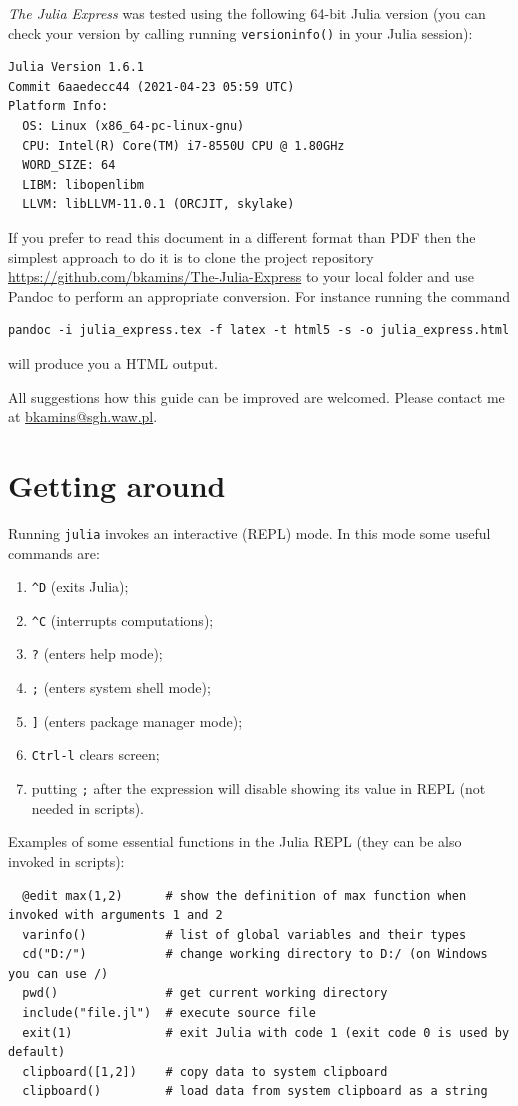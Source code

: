 \documentclass[10pt,a4paper]{article}
\begin{document}
\emph{The Julia Express} was tested using the following 64-bit Julia version
(you can check your version by calling running \lstinline|versioninfo()| in your
Julia session):
\begin{lstlisting}
Julia Version 1.6.1
Commit 6aaedecc44 (2021-04-23 05:59 UTC)
Platform Info:
  OS: Linux (x86_64-pc-linux-gnu)
  CPU: Intel(R) Core(TM) i7-8550U CPU @ 1.80GHz
  WORD_SIZE: 64
  LIBM: libopenlibm
  LLVM: libLLVM-11.0.1 (ORCJIT, skylake)
\end{lstlisting}



If you prefer to read this document in a different format than PDF then the
simplest approach to do it is to clone the project repository
\url{https://github.com/bkamins/The-Julia-Express} to your local folder and use
Pandoc to perform an appropriate conversion. For instance running the command
\begin{lstlisting}
pandoc -i julia_express.tex -f latex -t html5 -s -o julia_express.html
\end{lstlisting}
will produce you a HTML output.

All suggestions how this guide can be improved are welcomed. Please contact me at \href{mailto:bkamins@sgh.waw.pl}{bkamins@sgh.waw.pl}.

\section{Getting around}

Running \lstinline|julia| invokes an interactive (REPL) mode.
In this mode some useful commands are:
\begin{enumerate}[label=\arabic*),nolistsep]
  \item \lstinline|^D| (exits Julia);
  \item \lstinline|^C| (interrupts computations);
  \item \lstinline|?| (enters help mode);
  \item \lstinline|;| (enters system shell mode);
  \item \lstinline|]| (enters package manager mode);
  \item \lstinline|Ctrl-l| clears screen;
  \item putting \lstinline|;| after the expression will disable showing its value
        in REPL (not needed in scripts).
\end{enumerate}

Examples of some essential functions in the Julia REPL (they can be also invoked in scripts):
\begin{lstlisting}
  @edit max(1,2)      # show the definition of max function when invoked with arguments 1 and 2
  varinfo()           # list of global variables and their types
  cd("D:/")           # change working directory to D:/ (on Windows you can use /)
  pwd()               # get current working directory
  include("file.jl")  # execute source file
  exit(1)             # exit Julia with code 1 (exit code 0 is used by default)
  clipboard([1,2])    # copy data to system clipboard
  clipboard()         # load data from system clipboard as a string
\end{lstlisting}
\end{document}
